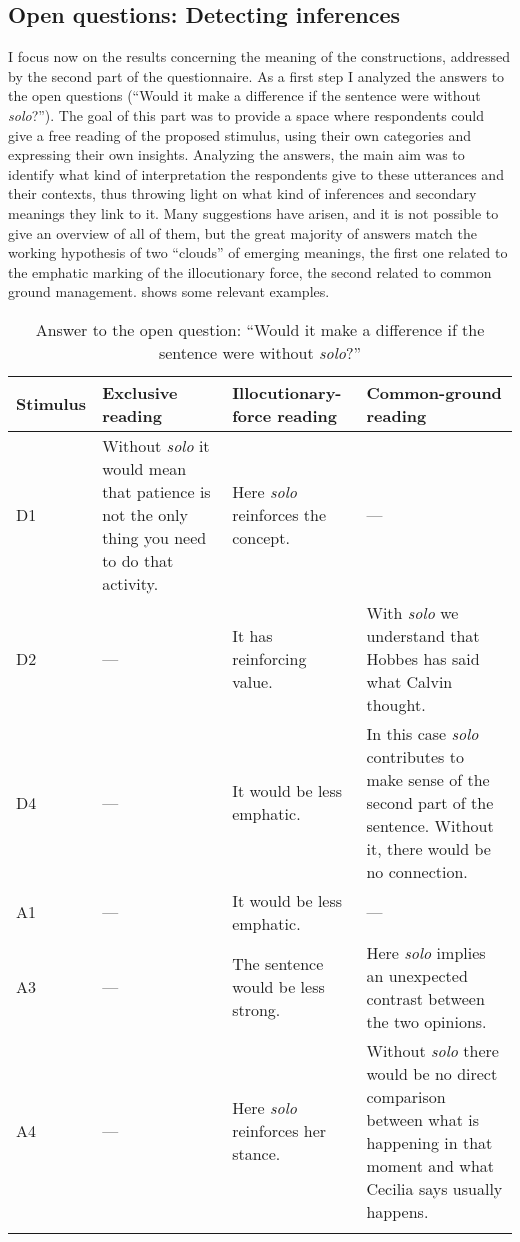 \subsection{Open questions: Detecting inferences}
\hypertarget{Toc124860677}{}
I focus now on the results concerning the meaning of the constructions, addressed by the second part of the questionnaire. As a first step I analyzed the answers to the open questions (“Would it make a difference if the sentence were without \textit{solo}?”). The goal of this part was to provide a space where respondents could give a free reading of the proposed stimulus, using their own categories and expressing their own insights. Analyzing the answers, the main aim was to identify what kind of interpretation the respondents give to these utterances and their contexts, thus throwing light on what kind of inferences and secondary meanings they link to it. Many suggestions have arisen, and it is not possible to give an overview of all of them, but the great majority of answers match the working hypothesis of two “clouds” of emerging meanings, the first one related to the emphatic marking of the illocutionary force, the second related to common ground management.  shows some relevant examples.

\begin{table}
\small
\begin{tabularx}{\textwidth}{lQQQ}
\lsptoprule
Stimulus & Exclusive reading & Illocutionary-force reading & Common-ground reading\\
\midrule
D1 & Without \textit{solo} it would mean that patience is not the only thing you need to do that activity. & Here \textit{solo} reinforces the concept. & —\\
\tablevspace
D2 & — & It has reinforcing value. & With \textit{solo} we understand that Hobbes has said what Calvin thought.\\
\tablevspace
D4 & — & It would be less emphatic. & In this case \textit{solo} contributes to make sense of the second part of the sentence. Without it, there would be no connection.\\
\tablevspace
A1 & — & It would be less emphatic. & —\\
\tablevspace
A3 & — & The sentence would be less strong. & Here \textit{solo} implies an unexpected contrast between the two opinions.\\
\tablevspace
A4 & — & Here \textit{solo} reinforces her stance. & Without \textit{solo} there would be no direct comparison between what is happening in that moment and what Cecilia says usually happens.\\
\lspbottomrule
\end{tabularx}
\caption{\label{tab:key:8.2} Answer to the open question: “Would it make a difference if the sentence were without \textit{solo}?”}
\end{table}

